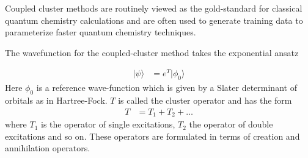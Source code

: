 \documentclass[book.tex]{subfiles}
\begin{document}
Coupled cluster methods are routinely viewed as the gold-standard for classical quantum chemistry calculations and are often used to generate training data to parameterize faster quantum chemistry techniques.

The wavefunction for the coupled-cluster method takes the exponential ansatz

\begin{align}
| \psi \rangle &= e^T |\phi_0\rangle
\end{align}
Here $\phi_0$ is a reference wave-function which is given by a Slater determinant of orbitals as in Hartree-Fock. $T$ is called the cluster operator and has the form
\begin{align}
T &= T_1 + T_2 + \dotsc
\end{align}
where $T_1$ is the operator of single excitations, $T_2$ the operator of double excitations and so on. These operators are formulated in terms of creation and annihilation operators.
\end{document}
